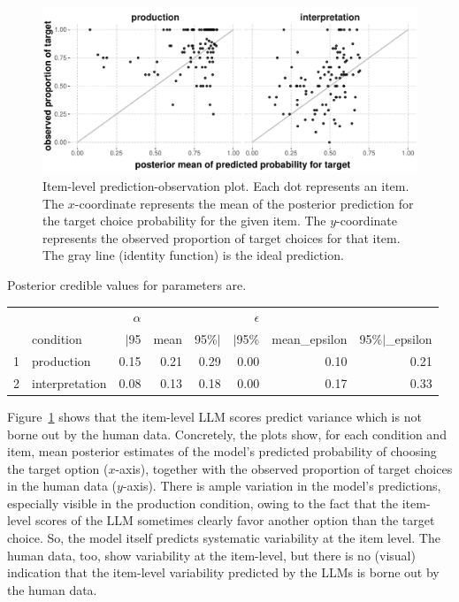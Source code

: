 \documentclass[fleqn]{article}
\begin{document}
\begin{figure}[t]
  \centering

  \includegraphics[width = 0.9\linewidth]{00-pics/item-combined-obs-pred.pdf}

  \caption{
    Item-level prediction-observation plot.
    Each dot represents an item.
    The $x$-coordinate represents the mean of the posterior prediction for the target choice probability for the given item.
    The $y$-coordinate represents the observed proportion of target choices for that item.
    The gray line (identity function) is the ideal prediction.
  }
  \label{fig:item-level-obs-pred}
\end{figure}

Posterior credible values for parameters are.

\begin{table}[ht]
\centering
\begin{tabular}{rlrrrrrr}
  \toprule
 && $\alpha$ &&& \(\epsilon\) & \\
 & condition & $|$95 & mean & 95\%$|$ & $|$95\% & mean\_epsilon & 95\%$|$\_epsilon \\ \midrule
1 & production & 0.15 & 0.21 & 0.29 & 0.00 & 0.10 & 0.21 \\
  2 & interpretation & 0.08 & 0.13 & 0.18 & 0.00 & 0.17 & 0.33 \\
   \bottomrule
\end{tabular}
\end{table}



Figure~\ref{fig:item-level-obs-pred} shows that the item-level LLM scores predict variance which is not borne out by the human data.
Concretely, the plots show, for each condition and item, mean posterior estimates of the model's predicted probability of choosing the target option ($x$-axis), together with the observed proportion of target choices in the human data ($y$-axis).
There is ample variation in the model's predictions, especially visible in the production condition, owing to the fact that the item-level scores of the LLM sometimes clearly favor another option than the target choice.
So, the model itself predicts systematic variability at the item level.
The human data, too, show variability at the item-level, but there is no (visual) indication that the item-level variability predicted by the LLMs is borne out by the human data.
\end{document}
